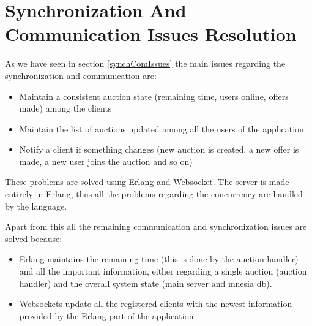 \section{Synchronization And Communication Issues Resolution}
\noindent As we have seen in section \ref{synchComIssues} the main issues regarding the synchronization and communication are:
\begin{itemize}
	\item Maintain a consistent auction state (remaining time, users online, offers made) among the clients
	\item Maintain the list of auctions updated among all the users of the application
	\item Notify a client if something changes (new auction is created, a new offer is made, a new user joins the auction and so on)
\end{itemize}

\noindent These problems are solved using Erlang and Websocket. The server is made entirely in Erlang, thus all the problems regarding the concurrency are handled by the language.

\noindent Apart from this all the remaining communication and synchronization issues are solved because:

\begin{itemize}
	\item Erlang maintains the remaining time (this is done by the auction handler) and all the important information, either regarding a single auction (auction handler) and the overall system state (main server and mnesia db).
	\item Websockets update all the registered clients with the newest information provided by the Erlang part of the application.  
\end{itemize}
